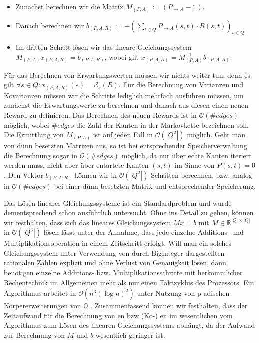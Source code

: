 \documentclass[a4paper]{article}
\theoremstyle{nonumberplain}
\begin{document}
\begin{itemize}
	\item Zunächst berechnen wir die Matrix $M_{(P,A)} := (P_{\rightarrow A} - \mathbb{1})$.
	\item Danach berechnen wir $b_{(P,A,R)} := - \left(\sum_{t \in Q}{ P_{\rightarrow A}(s,t) \cdot R(s,t) }\right)_{s \in Q}$
	\item Im dritten Schritt lösen wir das lineare Gleichungssystem $M_{(P,A)}x_{(P,A,R)} = b_{(P,A,R)}$, wobei gilt $x_{(P,A,R)} = M_{(P,A)}^{-1}b_{(P,A,R)}$.
\end{itemize}

Für das Berechnen von Erwartungswerten müssen wir nichts weiter tun, denn es gilt $\forall s\in Q : x_{(P,A,R)}(s) = \mathcal{E}_s(R)$.
Für die Berechnung von Varianzen und Kovarianzen müssen wir die Schritte lediglich mehrfach ausführen müssen, um zunächst die Erwartungswerte zu berechnen und danach aus diesen einen neuen Reward zu definieren. Das Berechnen des neuen Rewards ist in $\mathcal{O}(\#edges)$ möglich, wobei $\#edges$ die Zahl der Kanten in der Markovkette bezeichnen soll. Die Ermittlung von $M_{(P,A)}$ ist auf jeden Fall in $\mathcal{O}(|Q^2|)$ möglich. Geht man von dünn besetzten Matrizen aus, so ist bei entsprechender Speicherverwaltung die Berechnung sogar in $\mathcal{O}(\#edges)$ möglich, da nur über echte Kanten iteriert werden muss, nicht aber über entartete Kanten $(s,t)$ im Sinne von $P(s,t) = 0$. Den Vektor $b_{(P,A,R)}$ können wir in $\mathcal{O}(|Q^2|)$ Schritten berechnen, bzw. analog in $\mathcal{O}(\#edges)$ bei einer dünn besetzten Matrix und entsprechender Speicherung.


Das Lösen linearer Gleichungssysteme ist ein Standardproblem und wurde dementsprechend schon ausführlich untersucht. Ohne ins Detail zu gehen, können wir festhalten, dass sich das lineares Gleichungssystem $Mx = b$ mit $M \in \mathbb{R}^{|Q|\times|Q|}$  in $\mathcal{O}(|Q^3|)$ lösen lässt unter der Annahme, dass jede einzelne Additions- und Multiplikationsoperation in einem Zeitschritt erfolgt. Will man ein solches Gleichungssystem unter Verwendung von durch BigInteger dargestellten rationalen Zahlen explizit und ohne Verlust von Genauigkeit lösen, dann benötigen einzelne Additions- bzw. Multiplikationsschritte mit herkömmlicher Rechentechnik im Allgemeinen mehr als nur einen Taktzyklus des Prozessors. Ein Algorithmus arbeitet in $\mathcal{O}(n^3(\log n)^2)$ unter Nutzung von p-adischen Körper\-er\-wei\-ter\-ung\-en von $\mathbb{Q}$ \cite{Dixon1982}.
Zusammenfassend können wir festhalten, dass der Zeitaufwand für die Berechnung von \expect{}en bzw (Ko-) \var{}en im wesentlichen vom Algorithmus zum Lösen des linearen Gleichungssystems abhängt, da der Aufwand zur Berechnung von $M$ und $b$ wesentlich geringer ist.
\end{document}
